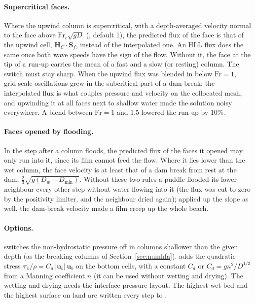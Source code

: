 \paragraph{Supercritical faces.} Where the upwind column is supercritical,
with a depth-averaged velocity normal to the face above
$\mathrm{Fr}_c\sqrt{gD}$ (, default 1), the predicted flux of
the face is that of the upwind cell, $\bm{H}_C\cdot\bm{S}_f$, instead of the
interpolated one. An HLL flux does the same once both wave speeds have the
sign of the flow. Without it, the face at the tip of a run-up carries the mean
of a fast and a slow (or resting) column. The switch must stay sharp. When the
upwind flux was blended in below $\mathrm{Fr} = 1$, grid-scale oscillations
grew in the subcritical part of a dam break: the interpolated flux is what
couples pressure and velocity on the collocated mesh, and upwinding it at all
faces next to shallow water made the solution noisy everywhere. A blend
between $\mathrm{Fr} = 1$ and 1.5 lowered the run-up by 10\%.

\paragraph{Faces opened by flooding.} In the step after a column floods, the
predicted flux of the faces it opened may only run into it, since its film
cannot feed the flow. Where it lies lower than the wet column, the face
velocity is at least that of a dam break from rest at the dam,
$\tfrac23\sqrt{g(D_w - D_{\min})}$. Without these two rules a puddle flooded its
lower neighbour every other step without water flowing into it (the flux was
cut to zero by the positivity limiter, and the neighbour dried again); applied
up the slope as well, the dam-break velocity made a film creep up the whole
beach.

\paragraph{Options.}  switches the non-hydrostatic
pressure off in columns shallower than the given depth (as the breaking
columns of Section~\ref{sec:numhfa}).  adds the quadratic
stress $\bm{\tau}_b/\rho = C_d\,|\bm{u}_b|\,\bm{u}_b$ on the bottom cells,
with a constant $C_d$ or $C_d = g n^2/D^{1/3}$ from a Manning coefficient $n$
(it can be used without wetting and drying). The wetting and drying needs the
interface pressure layout. The highest wet bed and the highest surface on land
are written every step to .

